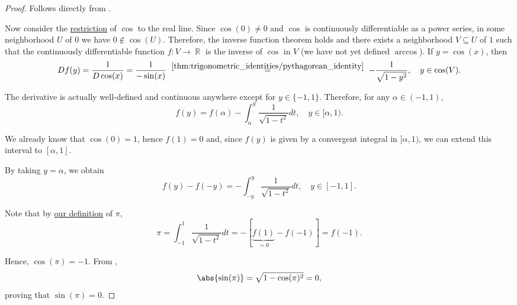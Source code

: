 \begin{proof}
   Follows directly from .

   Now consider the \hyperref[def:set_valued_map/restriction]{restriction} of \( \cos \) to the real line. Since \( \cos(0) \neq 0 \) and \( \cos \) is continuously differentiable as a power series, in some neighborhood \( U \) of \( 0 \) we have \( 0 \not\in \cos(U) \). Therefore, the inverse function theorem holds and there exists a neighborhood \( V \subseteq U \) of \( 1 \) such that the continuously differentiable function \( f: V \to \BbbR \) is the inverse of \( \cos \) in \( V \) (we have not yet defined \hyperref[def:inverse_trigonometric_functions/arccos]{\( \arccos \)}). If \( y = \cos(x) \), then
  \begin{equation*}
    Df(y)
    =
    \frac 1 {D\cos(x)}
    =
    \frac 1 {-\sin(x)}
    \reloset {\ref{thm:trigonometric_identities/pythagorean_identity}} =
    -\frac 1 {\sqrt{1 - y^2}},
    \quad y \in \cos(V).
  \end{equation*}

  The derivative is actually well-defined and continuous anywhere except for \( y \in \{ -1, 1 \} \). Therefore, for any \( \alpha \in (-1, 1) \),
  \begin{equation*}
    f(y) = f(\alpha) - \int_{\alpha}^y \frac 1 {\sqrt{1 - t^2}} dt, \quad y \in [\alpha, 1).
  \end{equation*}

  We already know that \( \cos(0) = 1 \), hence \( f(1) = 0 \) and, since \( f(y) \) is given by a convergent integral in \( [\alpha, 1) \), we can extend this interval to \( [\alpha, 1] \).

  By taking \( y = \alpha \), we obtain
  \begin{equation*}
    f(y) - f(-y) = -\int_{-y}^y \frac 1 {\sqrt{1 - t^2}} dt, \quad y \in [-1, 1].
  \end{equation*}

  Note that by \hyperref[def:pi]{our definition} of \( \pi \),
  \begin{equation*}
    \pi
    =
    \int_{-1}^1 \frac 1 {\sqrt{1 - t^2}} dt
    =
    -[\underbrace{f(1)}_{=0} - f(-1)]
    =
    f(-1).
  \end{equation*}

  Hence, \( \cos(\pi) = -1 \). From ,
  \begin{equation*}
    \abs{\sin(\pi)} = \sqrt{1 - \cos(\pi)^2} = 0,
  \end{equation*}
  proving that \( \sin(\pi) = 0 \).


\end{proof}
